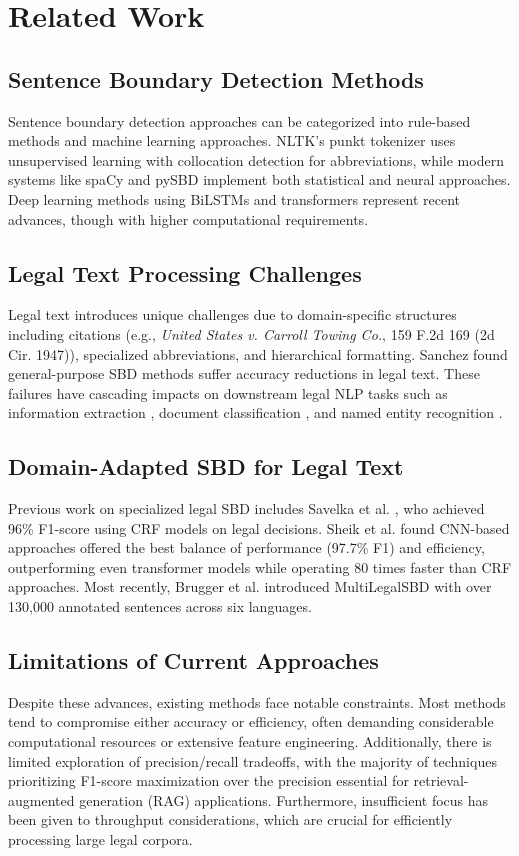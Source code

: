 \section{Related Work}
 
\subsection{Sentence Boundary Detection Methods}
Sentence boundary detection approaches can be categorized into rule-based methods and machine learning approaches. NLTK's punkt tokenizer \cite{kiss2006unsupervised} uses unsupervised learning with collocation detection for abbreviations, while modern systems like spaCy \cite{spacy} and pySBD \cite{sadvilkar2020pysbd} implement both statistical and neural approaches. Deep learning methods using BiLSTMs and transformers \cite{chen-2019-bert} represent recent advances, though with higher computational requirements.

\subsection{Legal Text Processing Challenges}
Legal text introduces unique challenges due to domain-specific structures including citations (e.g., \textit{United States v. Carroll Towing Co.}, 159 F.2d 169 (2d Cir. 1947)), specialized abbreviations, and hierarchical formatting. Sanchez \cite{sanchez2019sentence} found general-purpose SBD methods suffer accuracy reductions in legal text. These failures have cascading impacts on downstream legal NLP tasks such as information extraction \cite{chalkidis2018obligation}, document classification \cite{chalkidis2019deep}, and named entity recognition \cite{leitner2019fine}.

\subsection{Domain-Adapted SBD for Legal Text}
Previous work on specialized legal SBD includes Savelka et al. \cite{savelka2017}, who achieved 96\% F1-score using CRF models on legal decisions. Sheik et al. \cite{sheik2022} found CNN-based approaches offered the best balance of performance (97.7\% F1) and efficiency, outperforming even transformer models while operating 80 times faster than CRF approaches. Most recently, Brugger et al. \cite{multilegalSBD} introduced MultiLegalSBD with over 130,000 annotated sentences across six languages.

\subsection{Limitations of Current Approaches}
Despite these advances, existing methods face notable constraints. Most methods tend to compromise either accuracy or efficiency, often demanding considerable computational resources or extensive feature engineering. Additionally, there is limited exploration of precision/recall tradeoffs, with the majority of techniques prioritizing F1-score maximization over the precision essential for retrieval-augmented generation (RAG) applications. Furthermore, insufficient focus has been given to throughput considerations, which are crucial for efficiently processing large legal corpora.

